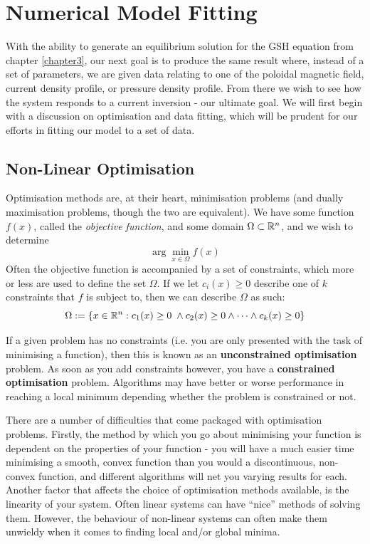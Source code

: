 
\chapter{Numerical Model Fitting}
\label{chapter4}

With the ability to generate an equilibrium solution for the GSH equation from chapter \ref{chapter3}, 
our next goal is to produce the same result where, instead of a set of parameters, we are given data relating to one 
of the poloidal magnetic field, current density profile, or pressure density profile. From there we wish to see how the 
system responds to a current inversion - our ultimate goal. We will first begin with a discussion on 
optimisation and data fitting, which will be prudent for our efforts in fitting our model to a set of data.

\section{Non-Linear Optimisation}

Optimisation methods are, at their heart, minimisation problems (and dually maximisation problems, 
though the two are equivalent). We have some function $f(x)$, called the \textit{objective function},
and some domain $\Omega \subset \mathbb{R}^n$, and we wish to determine
$$\arg\min_{x \in \Omega} f(x)$$
Often the objective function is accompanied by a set of constraints, which more or 
less are used to define the set $\Omega$. If we let $c_i(x) \ge 0$ describe one of $k$ constraints that $f$ 
is subject to, then we can describe $\Omega$ as such:
$$\Omega := \lbrace x \in \mathbb{R}^n : c_1(x) \ge 0 \; \land c_2(x) \ge 0 \land \dots \land c_k(x) \ge 0 \rbrace$$

\begin{remark}
    If a given problem has no constraints (i.e. you are only presented with the task of minimising a function), then 
    this is known as an \textbf{unconstrained optimisation} problem. As soon as you add constraints however, you have a 
    \textbf{constrained optimisation} problem. Algorithms may have better or worse performance in reaching a local minimum 
    depending whether the problem is constrained or not.
\end{remark}

There are a number of difficulties that come packaged with optimisation problems. Firstly, 
the method by which you go about minimising your function is dependent on the properties of your function 
- you will have a much easier time minimising a smooth, convex function than you would a discontinuous, 
non-convex function, and different algorithms will net you varying results for each. Another factor 
that affects the choice of optimisation methods available, is the linearity of your system. Often linear systems 
can have ``nice'' methods of solving them. However, the behaviour of non-linear systems can often make them 
unwieldy when it comes to finding local and/or global minima. 

